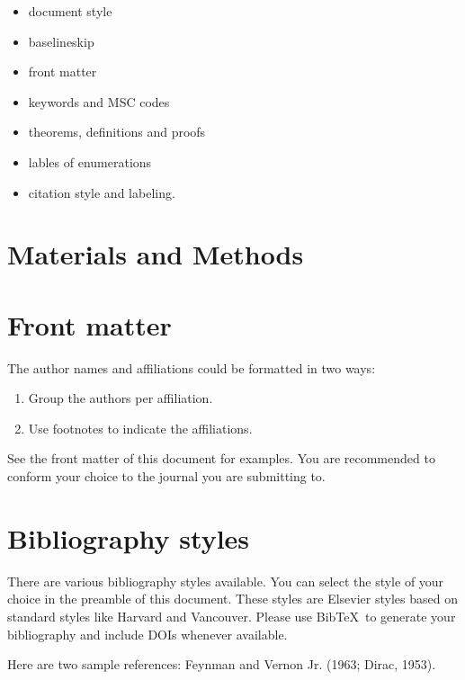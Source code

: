 \documentclass[]{elsarticle} %
\begin{document}
\begin{itemize}
\item
  document style
\item
  baselineskip
\item
  front matter
\item
  keywords and MSC codes
\item
  theorems, definitions and proofs
\item
  lables of enumerations
\item
  citation style and labeling.
\end{itemize}

\hypertarget{materials-and-methods}{%
\section{Materials and Methods}\label{materials-and-methods}}

\hypertarget{front-matter}{%
\section{Front matter}\label{front-matter}}

The author names and affiliations could be formatted in two ways:

\begin{enumerate}
\def\labelenumi{(\arabic{enumi})}
\item
  Group the authors per affiliation.
\item
  Use footnotes to indicate the affiliations.
\end{enumerate}

See the front matter of this document for examples. You are recommended
to conform your choice to the journal you are submitting to.

\hypertarget{bibliography-styles}{%
\section{Bibliography styles}\label{bibliography-styles}}

There are various bibliography styles available. You can select the
style of your choice in the preamble of this document. These styles are
Elsevier styles based on standard styles like Harvard and Vancouver.
Please use BibTeX~to generate your bibliography and include DOIs
whenever available.

Here are two sample references: Feynman and Vernon Jr. (1963; Dirac,
1953).
\end{document}
